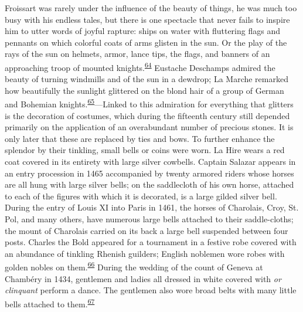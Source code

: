 Froissart was rarely under the influence of the beauty of things, he was
much too busy with his endless tales, but there is one spectacle that
never fails to inspire him to utter words of joyful rapture: ships on
water with fluttering flags and pennants on which colorful coats of arms
glisten in the sun. Or the play of the rays of the sun on helmets,
armor, lance tips, the flags, and banners of an approaching troop of
mounted
knights.\textsuperscript{\protect\hypertarget{20_ILLUSTRATIONS_FOLLOW_PAGE.xhtmlux5cux23id_346}{\protect\hyperlink{23_NOTES.xhtmlux5cux23id_347}{64}}}
Eustache Deschamps admired the beauty of turning windmills and of the
sun in a dewdrop; La Marche remarked how beautifully the sunlight
glittered on the blond hair of a group of German and Bohemian
knights.\textsuperscript{\protect\hypertarget{20_ILLUSTRATIONS_FOLLOW_PAGE.xhtmlux5cux23id_344}{\protect\hyperlink{23_NOTES.xhtmlux5cux23id_345}{65}}}---Linked
to this admiration for everything that glitters is the decoration of
costumes, which during the fifteenth century still depended primarily on
the application of an overabundant number of precious stones. It is only
later that these are replaced by ties
\protect\hypertarget{20_ILLUSTRATIONS_FOLLOW_PAGE.xhtmlux5cux23page_325}{}{}and
bows. To further enhance the splendor by their tinkling, small bells or
coins were worn. La Hire wears a red coat covered in its entirety with
large silver cowbells. Captain Salazar appears in an entry procession in
1465 accompanied by twenty armored riders whose horses are all hung with
large silver bells; on the saddlecloth of his own horse, attached to
each of the figures with which it is decorated, is a large gilded silver
bell. During the entry of Louis XI into Paris in 1461, the horses of
Charolais, Croy, St. Pol, and many others, have numerous large bells
attached to their saddle-cloths; the mount of Charolais carried on its
back a large bell suspended between four posts. Charles the Bold
appeared for a tournament in a festive robe covered with an abundance of
tinkling Rhenish guilders; English noblemen wore robes with golden
nobles on
them.\textsuperscript{\protect\hypertarget{20_ILLUSTRATIONS_FOLLOW_PAGE.xhtmlux5cux23id_342}{\protect\hyperlink{23_NOTES.xhtmlux5cux23id_343}{66}}}
During the wedding of the count of Geneva at Chambéry in 1434, gentlemen
and ladies all dressed in white covered with \emph{or clinquant} perform
a dance. The gentlemen also wore broad belts with many little bells
attached to
them.\textsuperscript{\protect\hypertarget{20_ILLUSTRATIONS_FOLLOW_PAGE.xhtmlux5cux23id_340}{\protect\hyperlink{23_NOTES.xhtmlux5cux23id_341}{67}}}

